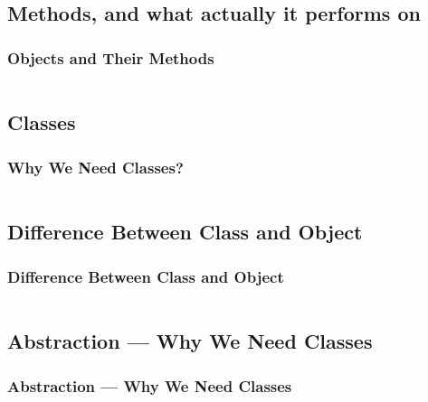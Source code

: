 \documentclass[en, 11pt, xcolor=dvipsnames]{beamer}
\begin{document}
\subsection{Methods, and what actually it performs on}
\begin{frame}[fragile]
	\frametitle{Objects and Their Methods}

	\begin{columns}
		\begin{column}{0.98\textwidth}

		\end{column}
	\end{columns}

\end{frame}

\subsection{Classes}
\begin{frame}[fragile]
	\frametitle{Why We Need Classes?}

	\begin{columns}
		\begin{column}{0.98\textwidth}

		\end{column}
	\end{columns}

\end{frame}

\subsection{Difference Between Class and Object}
\begin{frame}[fragile]
	\frametitle{Difference Between Class and Object}

	\begin{columns}
		\begin{column}{0.98\textwidth}

		\end{column}
	\end{columns}

\end{frame}

\subsection{Abstraction --- Why We Need Classes}
\begin{frame}[fragile]
	\frametitle{Abstraction --- Why We Need Classes}

	\begin{columns}
		\begin{column}{0.98\textwidth}

		\end{column}
	\end{columns}

\end{frame}
\end{document}
